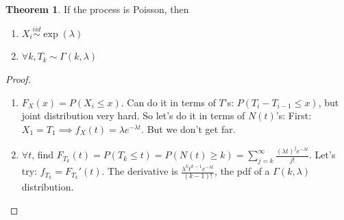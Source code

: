 \documentclass{article}
\theoremstyle{definition}
\newtheorem{theorem}{Theorem}[section]
\begin{document}
\begin{theorem}
If the process is Poisson, then
\begin{enumerate}
\item $X_i \overset{iid}{\sim} \exp(\lambda)$
\item $\forall k, T_k \sim \Gamma(k, \lambda)$
\end{enumerate}
\begin{proof}
\begin{enumerate}
\item $F_X(x) = P(X_i \le x)$. Can do it in terms of $T$'s: $P(T_i - T_{i-1} \le x)$, but joint distribution very hard. So let's do it in terms of $N(t)$'s:
First: $X_1 = T_1 \implies f_X(t) = \lambda e^{-\lambda t}$. But we don't get far. 
\item $\forall t$, find $F_{T_k}(t) = P(T_k \le t) = P(N(t) \ge k) = \sum_{j=k}^\infty \tfrac{(\lambda t)^j e^{-\lambda t}}{j!}$.
Let's try: $f_{T_k} = F_{T_k}'(t)$. The derivative is 
$\frac{\lambda^k t^{k-1} e^{-\lambda t}}{(k-1)!}$, the pdf of a $\Gamma(k, \lambda)$ distribution. 
\end{enumerate}
\end{proof}
\end{theorem}
\end{document}
